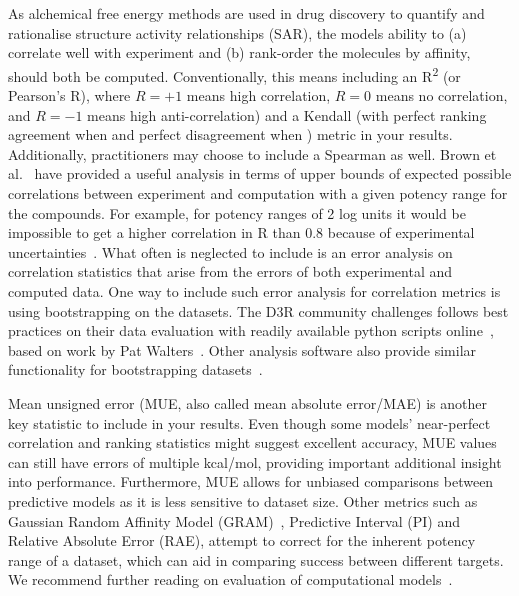 \documentclass[9pt,bestpractices]{livecoms}
\begin{document}
As alchemical free energy methods are used in drug discovery to quantify and rationalise structure activity relationships (SAR), the models ability to (a) correlate well with experiment and (b) rank-order the molecules by affinity, should both be computed. Conventionally, this means including an R\textsuperscript{2} (or Pearson's R), where $R=+1$ means high correlation, $R=0$ means no correlation, and $R=-1$ means high anti-correlation) and a Kendall \texttau{} (with perfect ranking agreement when  and perfect disagreement when ) metric in your results. Additionally, practitioners may choose to include a Spearman \textrho{} as well. Brown et al.~\cite{brown2009healthy} have provided a useful analysis in terms of upper bounds of expected possible correlations between experiment and computation with a given potency range for the compounds. For example, for potency ranges of 2 log units it would be impossible to get a higher correlation in R than 0.8 because of experimental uncertainties~\cite{brown2009healthy}. What often is neglected to include is an error analysis on correlation statistics that arise from the errors of both experimental and computed data. One way to include such error analysis for correlation metrics is using bootstrapping on the datasets. The D3R community challenges follows best practices on their data evaluation with readily available python scripts online~\cite{2018drugdata}, based on work by Pat Walters~\cite{walters2013what}. Other analysis software also provide similar functionality for bootstrapping datasets~\cite{antonia2019michellab}. 

Mean unsigned error (MUE, also called mean absolute error/MAE) is another key statistic to include in your results. Even though some models' near-perfect correlation and ranking statistics might suggest excellent accuracy, MUE values can still have errors of multiple kcal/mol, providing important additional insight into performance. Furthermore, MUE allows for unbiased comparisons between predictive models as it is less sensitive to dataset size. Other metrics such as Gaussian Random Affinity Model (GRAM)~\cite{cui2020gram}, Predictive Interval (PI) and Relative Absolute Error (RAE), attempt to correct for the inherent potency range of a dataset, which can aid in comparing success between different targets. We recommend further reading on evaluation of computational models~\cite{jain2008recommendations, walters2013what, brown2009healthy, walterthoughts}.
\end{document}
